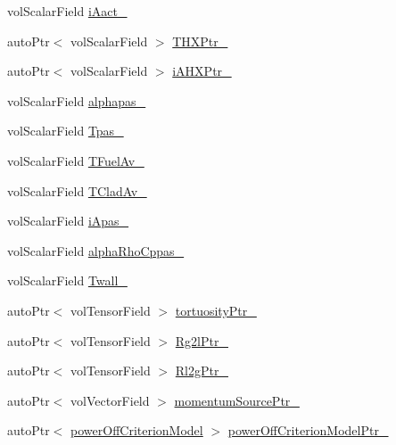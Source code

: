 \begin{DoxyCompactItemize}
\item 
vol\+Scalar\+Field \hyperlink{classFoam_1_1structure_afddfb535fdc0bdf71455350377cf04b0}{i\+Aact\+\_\+}
\item 
auto\+Ptr$<$ vol\+Scalar\+Field $>$ \hyperlink{classFoam_1_1structure_a10561a5a0129d753f69986052d8f6915}{T\+H\+X\+Ptr\+\_\+}
\item 
auto\+Ptr$<$ vol\+Scalar\+Field $>$ \hyperlink{classFoam_1_1structure_a2e32a84d29e89c7ca3d68eba83e0951b}{i\+A\+H\+X\+Ptr\+\_\+}
\item 
vol\+Scalar\+Field \hyperlink{classFoam_1_1structure_a344017f457bb8d5ccd4d5aa50bfdbd67}{alphapas\+\_\+}
\item 
vol\+Scalar\+Field \hyperlink{classFoam_1_1structure_a73c71b4d8cf465b7169f1a6ab38eb98f}{Tpas\+\_\+}
\item 
vol\+Scalar\+Field \hyperlink{classFoam_1_1structure_a2559cca0fa27c0e3e477299c9e8fee23}{T\+Fuel\+Av\+\_\+}
\item 
vol\+Scalar\+Field \hyperlink{classFoam_1_1structure_a2c1ab8d88c56439bff862edf333e7920}{T\+Clad\+Av\+\_\+}
\item 
vol\+Scalar\+Field \hyperlink{classFoam_1_1structure_a8db66c97ee877400eb17a41988b36995}{i\+Apas\+\_\+}
\item 
vol\+Scalar\+Field \hyperlink{classFoam_1_1structure_a331e87b4e7ad7605604e2ee79adc5005}{alpha\+Rho\+Cppas\+\_\+}
\item 
vol\+Scalar\+Field \hyperlink{classFoam_1_1structure_af6a8342527933c92e5c816c0e95d3a9c}{Twall\+\_\+}
\item 
auto\+Ptr$<$ vol\+Tensor\+Field $>$ \hyperlink{classFoam_1_1structure_ae0ff056471711dcbd82d9453f5b5dca0}{tortuosity\+Ptr\+\_\+}
\item 
auto\+Ptr$<$ vol\+Tensor\+Field $>$ \hyperlink{classFoam_1_1structure_aad4be68517f93bfd5183e78b0546af58}{Rg2l\+Ptr\+\_\+}
\item 
auto\+Ptr$<$ vol\+Tensor\+Field $>$ \hyperlink{classFoam_1_1structure_a1d90e77d688e89667573d8b298559160}{Rl2g\+Ptr\+\_\+}
\item 
auto\+Ptr$<$ vol\+Vector\+Field $>$ \hyperlink{classFoam_1_1structure_ac6ed53902f4341c29ea2143f2349ac8d}{momentum\+Source\+Ptr\+\_\+}
\item 
auto\+Ptr$<$ \hyperlink{classFoam_1_1powerOffCriterionModel}{power\+Off\+Criterion\+Model} $>$ \hyperlink{classFoam_1_1structure_a48dc19b9ab7e78e72916646ec5b4623c}{power\+Off\+Criterion\+Model\+Ptr\+\_\+}
\end{DoxyCompactItemize}


